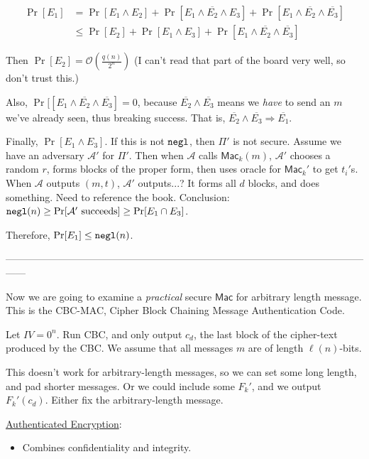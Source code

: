 \documentclass[12pt]{article}
\newcommand{\AAA}{\mathcal{A}}
\newcommand{\Mac}{\mathsf{Mac}}
\newcommand{\negl}{{\tt negl}}
\begin{document}
\begin{align*}
\Pr[E_1]&=\Pr[E_1\wedge E_2]+\Pr[E_1\wedge\overline{E_2}\wedge E_3]+\Pr[E_1\wedge\overline{E_2}\wedge\overline{E_3}]\\
&\leq\Pr[E_2]+\Pr[E_1\wedge E_3]+\Pr[E_1\wedge\overline{E_2}\wedge\overline{E_3}]
\end{align*}

Then $\Pr[E_2]=\mathcal{O}\left(\frac{q(n)}{2^n}\right)$ (I can't read that part of the board very well, so don't trust this.)

Also, $\Pr[[E_1\wedge\overline{E_2}\wedge\overline{E_3}]=0$, because $\overline{E_2}\wedge\overline{E_3}$ means we {\it have} to send an $m$ we've already seen, thus breaking success. That is, $\overline{E_2}\wedge\overline{E_3}\Rightarrow\overline{E_1}$.

Finally, $\Pr[E_1\wedge E_3]$. If this is not $\negl$, then $\Pi'$ is not secure. Assume we have an adversary $\AAA'$ for $\Pi'$. Then when $\AAA$ calls $\Mac_k(m)$, $\AAA'$ chooses a random $r$, forms blocks of the proper form, then uses oracle for $\Mac_k'$ to get $t_i'$s. When $\AAA$ outputs $(m,t)$, $\AAA'$ outputs...? It forms all $d$ blocks, and does something. Need to reference the book. Conclusion: $\negl(n)\geq\Pr[\AAA'{\text{ succeeds}}]\geq\Pr[E_1\cap E_3]$.

Therefore, $\Pr[E_1]\leq\negl(n)$.

------------------------------------------------------------------------------------------------------------------

Now we are going to examine a {\it practical} secure $\Mac$ for arbitrary length message. This is the CBC-MAC, Cipher Block Chaining Message Authentication Code.

Let $IV=0^n$. Run CBC, and only output $c_d$, the last block of the cipher-text produced by the CBC. We assume that all messages $m$ are of length $\ell(n)$-bits.

This doesn't work for arbitrary-length messages, so we can set some long length, and pad shorter messages. Or we could include some $F_k'$, and we output $F_k'(c_d)$. Either fix the arbitrary-length message.

\underline{Authenticated Encryption}:\begin{itemize}

\item Combines confidentiality and integrity.

\end{itemize}
\end{document}
